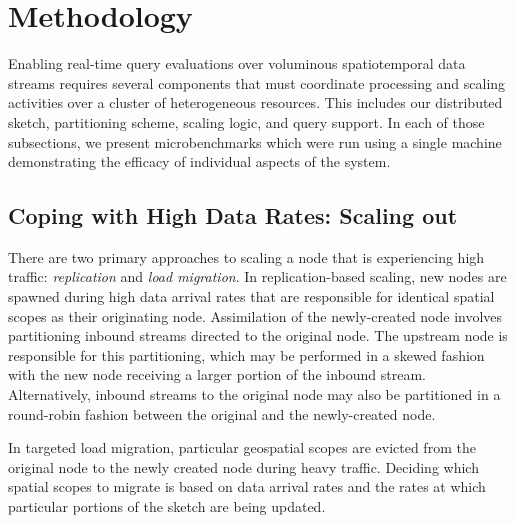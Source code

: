 \section{Methodology}
\label{sec:methodology}
Enabling real-time query evaluations over voluminous spatiotemporal data streams requires several components that must coordinate processing and scaling activities over a cluster of heterogeneous resources. This includes our distributed sketch, partitioning scheme, scaling logic, and query support. In each of those subsections, we present microbenchmarks which were run using a single machine demonstrating the efficacy of individual aspects of the system.









\subsection{Coping with High Data Rates: Scaling out}
\label{subsec:scaling-out}
%
There are two primary approaches to scaling a node that is experiencing high traffic: \emph{replication} and \emph{load migration}. In replication-based scaling, new nodes are spawned during high data arrival rates that are responsible for identical spatial scopes as their originating node. Assimilation of the newly-created node involves partitioning inbound streams directed to the original node. The upstream node is responsible for this partitioning, which may be performed in a skewed fashion with the new node receiving a larger portion of the inbound stream.  Alternatively, inbound streams to the original node may also be partitioned in a round-robin fashion between the original and the newly-created node.

In targeted load migration, particular geospatial scopes are evicted from the original node to the newly created node during heavy traffic. Deciding which spatial scopes to migrate is based on data arrival rates and the rates at which particular portions of the sketch are being updated.

